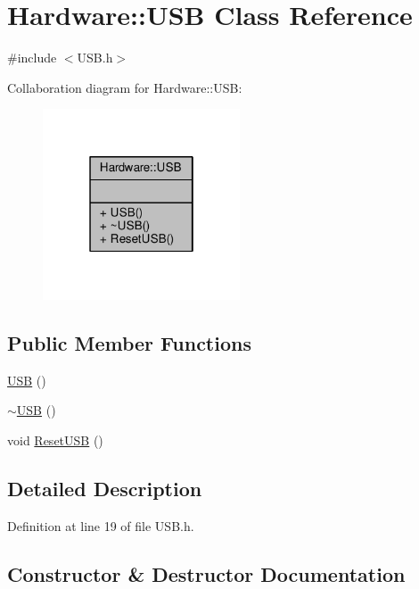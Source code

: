 \hypertarget{class_hardware_1_1_u_s_b}{}\section{Hardware\+:\+:U\+S\+B Class Reference}
\label{class_hardware_1_1_u_s_b}


{\ttfamily \#include $<$U\+S\+B.\+h$>$}



Collaboration diagram for Hardware\+:\+:U\+S\+B\+:\nopagebreak
\begin{figure}[H]
\begin{center}
\leavevmode
\includegraphics[width=166pt]{class_hardware_1_1_u_s_b__coll__graph}
\end{center}
\end{figure}
\subsection*{Public Member Functions}
\begin{DoxyCompactItemize}
\item 
\hyperlink{class_hardware_1_1_u_s_b_a225d2d24d36cc7c4e46f5c4d19f51fb8}{U\+S\+B} ()
\item 
\hyperlink{class_hardware_1_1_u_s_b_a808f13d66ce9bdf66a043fd02b4b8cf2}{$\sim$\+U\+S\+B} ()
\item 
void \hyperlink{class_hardware_1_1_u_s_b_af387867ec84f4c709b55e3605f9e313e}{Reset\+U\+S\+B} ()
\end{DoxyCompactItemize}


\subsection{Detailed Description}


Definition at line 19 of file U\+S\+B.\+h.



\subsection{Constructor \& Destructor Documentation}
\hypertarget{class_hardware_1_1_u_s_b_a225d2d24d36cc7c4e46f5c4d19f51fb8}{}
